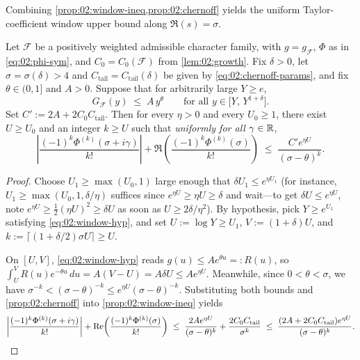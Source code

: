 Combining \cref{prop:02:window-ineq,prop:02:chernoff} yields the uniform Taylor-coefficient window upper bound along $\Re(s) = \sigma$.

\begin{corollary}
\label{cor:02:window-key}
Let $\mathcal{F}$ be a positively weighted admissible character family, with $g = g_{\mathcal{F}}$, $\Phi$ as in \eqref{eq:02:phi-sym}, and $C_0 = C_0(\mathcal{F})$ from \cref{lem:02:growth}. Fix $\delta > 0$, let $\sigma = \sigma(\delta) > 4$ and $C_{\mathrm{tail}} = C_{\mathrm{tail}}(\delta)$ be given by \eqref{eq:02:chernoff-params}, and fix $\theta \in (0, 1]$ and $A > 0$. Suppose that for arbitrarily large $Y \ge e$,
\begin{equation}
\label{eq:02:window-hyp}
  G_{\mathcal{F}}(y) \;\le\; A\, y^\theta \qquad \text{for all } y \in \bigl[Y,\, Y^{1+\delta}\bigr].
\end{equation}
Set $C' := 2 A + 2 C_0 C_{\mathrm{tail}}$. Then for every $\eta > 0$ and every $U_0 \ge 1$, there exist $U \ge U_0$ and an integer $k \ge U$ such that \emph{uniformly for all $\gamma \in \RR$},
\begin{equation}
\label{eq:02:taylor-key}
  \left|\frac{(-1)^k \Phi^{(k)}(\sigma + i\gamma)}{k!}\right|
  + \Re\!\left(\frac{(-1)^k \Phi^{(k)}(\sigma)}{k!}\right)
  \;\le\; \frac{C' e^{\eta U}}{(\sigma - \theta)^k}.
\end{equation}
\end{corollary}

\begin{proof}
Choose $U_1 \ge \max(U_0, 1)$ large enough that $\delta U_1 \le e^{\eta U_1}$ (for instance, $U_1 \ge \max(U_0, 1, \delta / \eta)$ suffices since $e^{\eta U} \ge \eta U \ge \delta$ and wait—to get $\delta U \le e^{\eta U}$, note $e^{\eta U} \ge \frac{1}{2}(\eta U)^2 \ge \delta U$ as soon as $U \ge 2\delta/\eta^2$). By hypothesis, pick $Y \ge e^{U_1}$ satisfying \eqref{eq:02:window-hyp}, and set $U := \log Y \ge U_1$, $V := (1+\delta)U$, and $k := \lceil (1+\delta/2)\sigma U \rceil \ge U$.

On $[U, V]$, \eqref{eq:02:window-hyp} reads $g(u) \le A e^{\theta u} =: R(u)$, so $\int_U^V R(u) e^{-\theta u}\,du = A(V - U) = A \delta U \le A e^{\eta U}$. Meanwhile, since $0 < \theta < \sigma$, we have $\sigma^{-k} < (\sigma - \theta)^{-k} \le e^{\eta U} (\sigma - \theta)^{-k}$. Substituting both bounds and \cref{prop:02:chernoff} into \cref{prop:02:window-ineq} yields
\[
  \left|\frac{(-1)^k \Phi^{(k)}(\sigma + i\gamma)}{k!}\right|
  + \Re\!\left(\frac{(-1)^k \Phi^{(k)}(\sigma)}{k!}\right)
  \;\le\; \frac{2A e^{\eta U}}{(\sigma - \theta)^k} + \frac{2C_0 C_{\mathrm{tail}}}{\sigma^k}
  \;\le\; \frac{(2A + 2C_0 C_{\mathrm{tail}}) e^{\eta U}}{(\sigma - \theta)^k}. \qedhere
\]
\end{proof}

